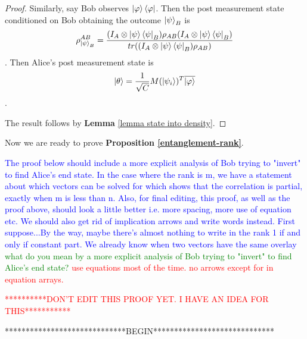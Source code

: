 \begin{proof}
Similarly, say Bob observes $\ket{\varphi}\bra{\varphi}$. Then the post measurement state conditioned on Bob obtaining the outcome $\ket{\psi}_B$ is $$\rho_{\ket{\psi}_B}^{AB}=\frac{(I_A \otimes \ket{\psi}\bra{\psi}_B  )\rho_{AB}(I_A \otimes \ket{\psi}\bra{\psi}_B)}{tr((I_A \otimes \ket{\psi}\bra{\psi}_B)\rho_{AB})}$$.
Then Alice's post measurement state is $$\ket{\theta}=\frac{1}{\sqrt{C}} M(\ket{\psi_i})^T \overline{\ket{\varphi}}$$.

The result follows by {\bf{Lemma}} \ref{lemma state into density}.
\end{proof}

\bigskip
Now we are ready to prove \textbf{Proposition \ref{entanglement-rank}}.

\textcolor{blue}{The proof below should include a more explicit analysis of Bob trying to "invert" to find Alice's end state. In the case where the rank is m, we have a statement about which vectors can be solved for which shows that the correlation is partial, exactly when m is less than n.  Also, for final editing, this proof, as well as the proof above, should look a little better i.e. more spacing, more use of equation etc.  We should also get rid of implication arrows and write words instead.  First suppose...By the way, maybe there's almost nothing to write in the rank 1 if and only if constant part.  We already know when two vectors have the same overlay} \textcolor{green}{what do you mean by a more explicit analysis of Bob trying to "invert" to find Alice's end state?}
\textcolor{red}{use equations most of the time. no arrows except for in equation arrays.}


\textcolor{red}{**********DON'T EDIT THIS PROOF YET.  I HAVE AN IDEA FOR THIS***********}

\medskip

*****************************BEGIN*****************************


